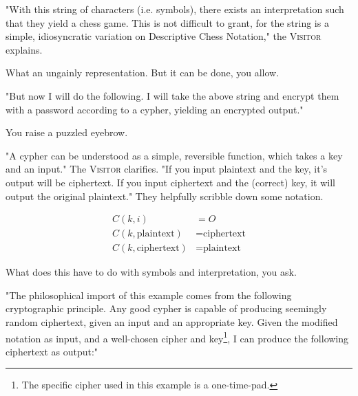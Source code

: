 "With this string of characters (i.e. symbols), there exists an interpretation such that they yield a chess game. This is not difficult to grant, for the string is a simple, idiosyncratic variation on Descriptive Chess Notation," the \textsc{Visitor} explains.

What an ungainly representation. But it can be done, you allow.

"But now I will do the following. I will take the above string and encrypt them with a password according to a cypher, yielding an encrypted output."

You raise a puzzled eyebrow.

"A cypher can be understood as a simple, reversible function, which takes a key and an input." The \textsc{Visitor} clarifies. "If you input plaintext and the key, it's output will be ciphertext. If you input ciphertext and the (correct) key, it will output the original plaintext." They helpfully scribble down some notation.

\begin{align*}
  C(k, i) &= O \\
  C(k, \text{plaintext}) &= \text{ciphertext} \\
  C(k, \text{ciphertext}) &= \text{plaintext}
\end{align*}

What does this have to do with symbols and interpretation, you ask.

"The philosophical import of this example comes from the following cryptographic principle. Any good cypher is capable of producing seemingly random ciphertext, given an input and an appropriate key. Given the modified notation as input, and a well-chosen cipher and key\footnote{The specific cipher used in this example is a one-time-pad.}, I can produce the following ciphertext as output:"

\begin{center}
\end{center}

